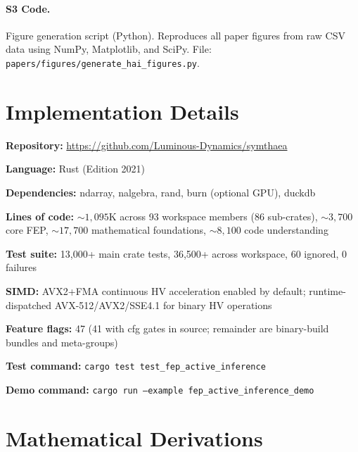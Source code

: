 \documentclass[10pt,letterpaper]{article}
\begin{document}
\paragraph*{S3 Code.}
\label{s3-code}
{Figure generation script (Python). Reproduces all paper figures from raw CSV
data using NumPy, Matplotlib, and SciPy. File:
\texttt{papers/figures/generate\_hai\_figures.py}.}




\appendix

\section{Implementation Details}
\label{app:implementation}

{\raggedright
\textbf{Repository:} \url{https://github.com/Luminous-Dynamics/symthaea}\par
\textbf{Language:} Rust (Edition 2021)\par
\textbf{Dependencies:} ndarray, nalgebra, rand, burn (optional GPU), duckdb\par
\textbf{Lines of code:} ${\sim}1{,}095$K across 93 workspace members (86 sub-crates), ${\sim}3{,}700$ core FEP, ${\sim}17{,}700$ mathematical foundations, ${\sim}8{,}100$ code understanding\par
\textbf{Test suite:} 13,000+ main crate tests, 36,500+ across workspace, 60 ignored, 0 failures\par
\textbf{SIMD:} AVX2+FMA continuous HV acceleration enabled by default; runtime-dispatched AVX-512/AVX2/SSE4.1 for binary HV operations\par
\textbf{Feature flags:} 47 (41 with cfg gates in source; remainder are binary-build bundles and meta-groups)\par
\textbf{Test command:} \texttt{cargo test test\_fep\_active\_inference}\par
\textbf{Demo command:} \texttt{cargo run --example fep\_active\_inference\_demo}\par
}

\section{Mathematical Derivations}
\label{app:derivations}
\end{document}
